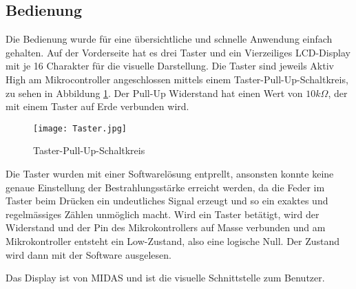 \subsection{Bedienung}
Die Bedienung wurde für eine übersichtliche und schnelle Anwendung einfach gehalten. Auf der Vorderseite hat es drei Taster und ein Vierzeiliges LCD-Display mit je 16 Charakter für die visuelle Darstellung. Die Taster sind jeweils Aktiv High am Mikrocontroller angeschlossen mittels einem Taster-Pull-Up-Schaltkreis, zu sehen in Abbildung \ref{fig:SwitchPullUp_Software}. Der Pull-Up Widerstand hat einen Wert von $10k\Omega$, der mit einem Taster auf Erde verbunden wird.

\begin{figure}[h]
	\centering
		\texttt{[image: Taster.jpg]}
	\caption{Taster-Pull-Up-Schaltkreis}
	\label{fig:SwitchPullUp_Software}
\end{figure}

Die Taster wurden mit einer Softwarelösung entprellt, ansonsten konnte keine genaue Einstellung der Bestrahlungsstärke erreicht werden, da die Feder im Taster beim Drücken ein undeutliches Signal erzeugt und so ein exaktes und regelmässiges Zählen unmöglich macht. Wird ein Taster betätigt, wird der Widerstand und der Pin des Mikrokontrollers auf Masse verbunden und am Mikrokontroller entsteht ein Low-Zustand, also eine logische Null. Der Zustand wird dann mit der Software ausgelesen.

Das Display ist von MIDAS und ist die visuelle Schnittstelle zum Benutzer. 